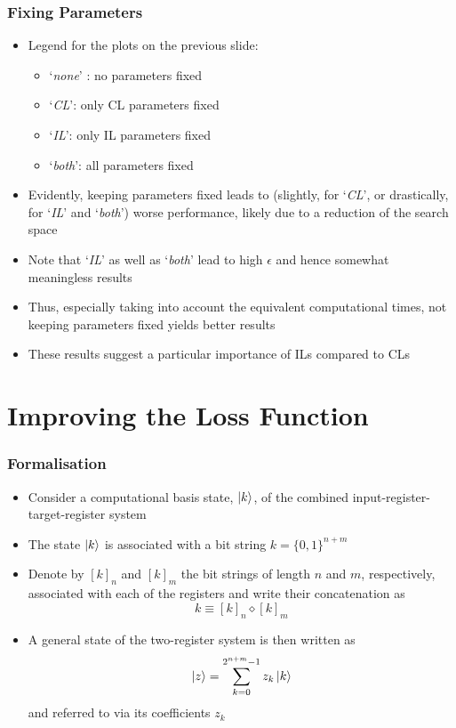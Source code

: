 \documentclass{beamer}
\begin{document}
\begin{frame}
\frametitle{Fixing Parameters}
\begin{itemize}
\item Legend for the plots on the previous slide:
\begin{itemize}
\item `\emph{none}' : no parameters fixed 
\item `\emph{CL}': only CL parameters fixed
\item `\emph{IL}': only IL parameters fixed 
\item `\emph{both}': all parameters fixed  
\end{itemize} 
\item Evidently, keeping parameters fixed leads to (slightly, for `\emph{CL}', or drastically, for `\emph{IL}' and `\emph{both}') \alert{worse performance}, likely due to a reduction of the search space  
\item Note that `\emph{IL}' as well as `\emph{both}' lead to high $\epsilon$ and hence somewhat meaningless results 
\item Thus, especially taking into account the equivalent computational times, \alert{not keeping parameters fixed yields better results} 
\item These results suggest a particular importance of ILs compared to CLs 
\end{itemize}
\end{frame}

\section{Improving the Loss Function}

\begin{frame}
\frametitle{Formalisation}
\begin{itemize}
\item Consider a computational basis state, $\ket{k}$, of the \alert{combined} input-register-target-register \alert{system} 
\item The state $\ket{k}$ is associated with a \alert{bit string} $k = \{0,1 \}^{n+m}$
\item Denote by $[k]_n$ and $[k]_m$ the bit strings of length $n$ and $m$, respectively, associated with each of the registers and write their \alert{concatenation} as 
\begin{equation}
k \equiv [k]_n \diamond [k]_m
\end{equation} 
\item A general state of the two-register system is then written as 
\begin{equation}
\ket{z} = \sum^{2^{n+m}-1}_{k=0} z_k \ket{k}
\end{equation}
and referred to via its \alert{coefficients} $z_k$
\end{itemize}
\end{frame}
\end{document}
